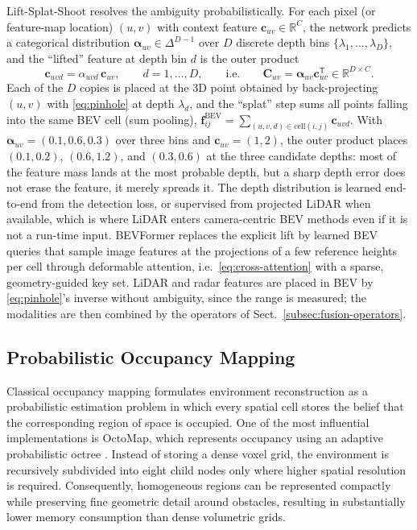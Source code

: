 Lift-Splat-Shoot \cite{philion2020_lss} resolves the ambiguity probabilistically. For each pixel (or feature-map location) $(u,v)$ with context feature $\mathbf{c}_{uv}\in\mathbb{R}^{C}$, the network predicts a categorical distribution $\boldsymbol{\alpha}_{uv}\in\Delta^{D-1}$ over $D$ discrete depth bins $\{\lambda_1,\ldots,\lambda_D\}$, and the ``lifted'' feature at depth bin $d$ is the outer product
\begin{equation}
\mathbf{c}_{uvd}=\alpha_{uvd}\,\mathbf{c}_{uv},\qquad d=1,\ldots,D,
\qquad\text{i.e.}\qquad
\mathbf{C}_{uv}=\boldsymbol{\alpha}_{uv}\mathbf{c}_{uv}^{\mathsf T}\in\mathbb{R}^{D\times C}.
\label{eq:lss-lift}
\end{equation}
Each of the $D$ copies is placed at the 3D point obtained by back-projecting $(u,v)$ with \eqref{eq:pinhole} at depth $\lambda_d$, and the ``splat'' step sums all points falling into the same BEV cell (sum pooling), $\mathbf{f}^{\mathrm{BEV}}_{ij}=\sum_{(u,v,d)\in\mathrm{cell}(i,j)}\mathbf{c}_{uvd}$. With $\boldsymbol{\alpha}_{uv}=(0.1,0.6,0.3)$ over three bins and $\mathbf{c}_{uv}=(1,2)$, the outer product places $(0.1,0.2)$, $(0.6,1.2)$, and $(0.3,0.6)$ at the three candidate depths: most of the feature mass lands at the most probable depth, but a sharp depth error does not erase the feature, it merely spreads it. The depth distribution is learned end-to-end from the detection loss, or supervised from projected LiDAR when available, which is where LiDAR enters camera-centric BEV methods even if it is not a run-time input. BEVFormer \cite{li2022_bevformer} replaces the explicit lift by learned BEV queries that sample image features at the projections of a few reference heights per cell through deformable attention, i.e.\ \eqref{eq:cross-attention} with a sparse, geometry-guided key set. LiDAR and radar features are placed in BEV by \eqref{eq:pinhole}'s inverse without ambiguity, since the range is measured; the modalities are then combined by the operators of Sect.~\ref{subsec:fusion-operators}.

\subsection{Probabilistic Occupancy Mapping}
\label{subsec:occupancy-mapping}

Classical occupancy mapping formulates environment reconstruction as a probabilistic estimation problem in which every spatial cell stores the belief that the corresponding region of space is occupied. One of the most influential implementations is OctoMap, which represents occupancy using an adaptive probabilistic octree \cite{hornung2013_octomap}. Instead of storing a dense voxel grid, the environment is recursively subdivided into eight child nodes only where higher spatial resolution is required. Consequently, homogeneous regions can be represented compactly while preserving fine geometric detail around obstacles, resulting in substantially lower memory consumption than dense volumetric grids.

